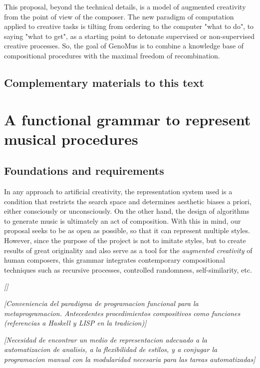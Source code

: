 \documentclass{article}
\begin{document}
This proposal, beyond the technical details, is a model of augmented creativity from the point of view of the composer. The new paradigm of computation applied to creative tasks is tilting from ordering to the computer "what to do", to saying "what to get", as a starting point to detonate supervised or non-supervised creative processes. So, the goal of GenoMus is to combine a knowledge base of compositional procedures with the maximal freedom of recombination. 

\subsection{Complementary materials to this text}





\section{A functional grammar to represent musical procedures}

\subsection{Foundations and requirements}

In any approach to artificial creativity, the representation system used is a condition that restricts the search space and determines aesthetic biases a priori, either consciously or unconsciously. On the other hand, the design of algorithms to generate music is ultimately an act of composition. With this in mind, our proposal seeks to be as open as possible, so that it can represent multiple styles. However, since the purpose of the project is not to imitate styles, but to create results of great originality and also serve as a tool for the \emph{augmented creativity} of human composers, this grammar integrates contemporary compositional techniques such as recursive processes, controlled randomness, self-similarity, etc.

{\color{gray} \textsl{[]}}

{\color{gray} \textsl{[Conveniencia del paradigma de programacion funcional para la metaprogramacion. Antecedentes procedimientos compositivos como funciones (referencias a Haskell y LISP en la tradicion)]}}

{\color{gray} \textsl{[Necesidad de encontrar un medio de representacion adecuado a la automatizacion de analisis, a la flexibilidad de estilos, y a conjugar la programacion manual con la modularidad necesaria para las tareas automatizadas]}}
\end{document}
